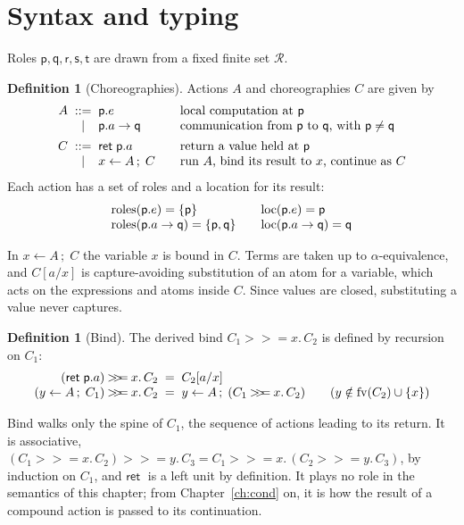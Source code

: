 \documentclass[11pt]{report}
\theoremstyle{plain}
\theoremstyle{definition}
\newtheorem{definition}[theorem]{Definition}
\theoremstyle{remark}
\newcommand{\kw}[1]{\mathsf{#1}}
\newcommand{\pp}{\mathsf{p}}
\newcommand{\qq}{\mathsf{q}}
\newcommand{\rr}{\mathsf{r}}
\newcommand{\sr}{\mathsf{s}}
\newcommand{\tr}{\mathsf{t}}
\newcommand{\Roles}{\mathcal{R}}
\newcommand{\fv}{\mathrm{fv}}
\newcommand{\bind}[3]{#1 \leftarrow #2\,;\;#3}
\newcommand{\cret}[1]{\kw{ret}\;#1}
\newcommand{\com}[3]{#1.#2 \to #3}
\newcommand{\mbind}[3]{#1 \mathbin{>\!\!>\!\!=} #2.\,#3}
\newcommand{\roles}[1]{\mathrm{roles}(#1)}
\newcommand{\loc}[1]{\mathrm{loc}(#1)}
\begin{document}
\section{Syntax and typing}
\label{sec:c1-syntax}

Roles $\pp,\qq,\rr,\sr,\tr$ are drawn from a fixed finite set $\Roles$.

\begin{definition}[Choreographies]\label{def:c1-syntax}
  Actions $A$ and choreographies $C$ are given by
  \[
  \begin{array}{r@{\;\;}c@{\;\;}l@{\qquad}l}
    A & ::= & \pp.e & \text{local computation at } \pp\\
      & \mid & \com{\pp}{a}{\qq} & \text{communication from $\pp$ to $\qq$, with } \pp\neq\qq\\[1ex]
    C & ::= & \cret{\pp.a} & \text{return a value held at } \pp\\
      & \mid & \bind{x}{A}{C} & \text{run $A$, bind its result to $x$, continue as } C
  \end{array}
  \]
  Each action has a set of roles and a location for its result:
  \[
  \begin{array}{l@{\qquad}l}
    \roles{\pp.e} = \{\pp\} & \loc{\pp.e} = \pp\\
    \roles{\com{\pp}{a}{\qq}} = \{\pp,\qq\} & \loc{\com{\pp}{a}{\qq}} = \qq
  \end{array}
  \]
\end{definition}

In $\bind{x}{A}{C}$ the variable $x$ is bound in $C$.  Terms are taken up to
$\alpha$-equivalence, and $C[a/x]$ is capture-avoiding substitution of an
atom for a variable, which acts on the expressions and atoms inside $C$.
Since values are closed, substituting a value never captures.

\begin{definition}[Bind]\label{def:c1-bind}
  The derived bind $\mbind{C_1}{x}{C_2}$ is defined by recursion on $C_1$:
  \[
  \begin{array}{r@{\;\;=\;\;}l@{\qquad}l}
    \mbind{(\cret{\pp.a})}{x}{C_2} & C_2[a/x]\\
    \mbind{(\bind{y}{A}{C_1})}{x}{C_2} & \bind{y}{A}{(\mbind{C_1}{x}{C_2})} & (y\notin\fv(C_2)\cup\{x\})
  \end{array}
  \]
\end{definition}

Bind walks only the spine of $C_1$, the sequence of actions leading to its
return.  It is associative,
$\mbind{(\mbind{C_1}{x}{C_2})}{y}{C_3} = \mbind{C_1}{x}{(\mbind{C_2}{y}{C_3})}$,
by induction on $C_1$, and $\cret{}$ is a left unit by definition.  It plays no
role in the semantics of this chapter; from Chapter~\ref{ch:cond} on, it is
how the result of a compound action is passed to its continuation.
\end{document}
